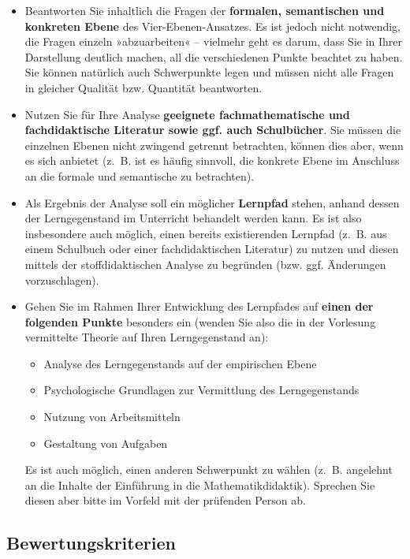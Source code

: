 \documentclass[
]{scrbook}
\providecommand{\tightlist}{%
  \setlength{\itemsep}{0pt}\setlength{\parskip}{0pt}}
\theoremstyle{definition}
\theoremstyle{definition}
\theoremstyle{definition}
\theoremstyle{definition}
\theoremstyle{remark}
\begin{document}
\begin{itemize}
\tightlist
\item
  Beantworten Sie inhaltlich die Fragen der \textbf{formalen, semantischen und konkreten Ebene} des Vier-Ebenen-Ansatzes. Es ist jedoch nicht notwendig, die Fragen einzeln »abzuarbeiten« -- vielmehr geht es darum, dass Sie in Ihrer Darstellung deutlich machen, all die verschiedenen Punkte beachtet zu haben. Sie können natürlich auch Schwerpunkte legen und müssen nicht alle Fragen in gleicher Qualität bzw. Quantität beantworten.
\item
  Nutzen Sie für Ihre Analyse \textbf{geeignete fachmathematische und fachdidaktische Literatur sowie ggf. auch Schulbücher}. Sie müssen die einzelnen Ebenen nicht zwingend getrennt betrachten, können dies aber, wenn es sich anbietet (z.~B. ist es häufig sinnvoll, die konkrete Ebene im Anschluss an die formale und semantische zu betrachten).
\item
  Als Ergebnis der Analyse soll ein möglicher \textbf{Lernpfad} stehen, anhand dessen der Lerngegenstand im Unterricht behandelt werden kann. Es ist also insbesondere auch möglich, einen bereits existierenden Lernpfad (z.~B. aus einem Schulbuch oder einer fachdidaktischen Literatur) zu nutzen und diesen mittels der stoffdidaktischen Analyse zu begründen (bzw. ggf. Änderungen vorzuschlagen).
\item
  Gehen Sie im Rahmen Ihrer Entwicklung des Lernpfades auf \textbf{einen der folgenden Punkte} besonders ein (wenden Sie also die in der Vorlesung vermittelte Theorie auf Ihren Lerngegenstand an):

  \begin{itemize}
  \tightlist
  \item
    Analyse des Lerngegenstands auf der empirischen Ebene
  \item
    Psychologische Grundlagen zur Vermittlung des Lerngegenstands
  \item
    Nutzung von Arbeitsmitteln
  \item
    Gestaltung von Aufgaben
  \end{itemize}

  Es ist auch möglich, einen anderen Schwerpunkt zu wählen (z.~B. angelehnt an die Inhalte der Einführung in die Mathematikdidaktik). Sprechen Sie diesen aber bitte im Vorfeld mit der prüfenden Person ab.
\end{itemize}

\hypertarget{bewertungskriterien}{%
\subsection{Bewertungskriterien}\label{bewertungskriterien}}
\end{document}
